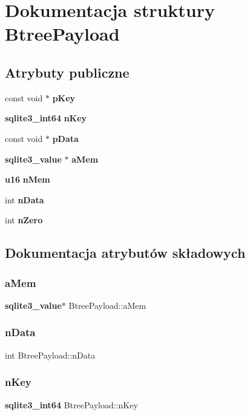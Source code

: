 \section{Dokumentacja struktury Btree\+Payload}
\label{struct_btree_payload}
\subsection*{Atrybuty publiczne}
\begin{DoxyCompactItemize}
\item 
const void $\ast$ \textbf{ p\+Key}
\item 
\textbf{ sqlite3\+\_\+int64} \textbf{ n\+Key}
\item 
const void $\ast$ \textbf{ p\+Data}
\item 
\textbf{ sqlite3\+\_\+value} $\ast$ \textbf{ a\+Mem}
\item 
\textbf{ u16} \textbf{ n\+Mem}
\item 
int \textbf{ n\+Data}
\item 
int \textbf{ n\+Zero}
\end{DoxyCompactItemize}


\subsection{Dokumentacja atrybutów składowych}
\mbox{\label{struct_btree_payload_a6fd089fe846d50ada04220f8ad5584c5}} 
\subsubsection{aMem}
{\footnotesize\ttfamily \textbf{ sqlite3\+\_\+value}$\ast$ Btree\+Payload\+::a\+Mem}

\mbox{\label{struct_btree_payload_a515a370eeb96e103dd716fa5149f2787}} 
\subsubsection{nData}
{\footnotesize\ttfamily int Btree\+Payload\+::n\+Data}

\mbox{\label{struct_btree_payload_ab47f827f8ad41b179f25693d867795a5}} 
\subsubsection{nKey}
{\footnotesize\ttfamily \textbf{ sqlite3\+\_\+int64} Btree\+Payload\+::n\+Key}

